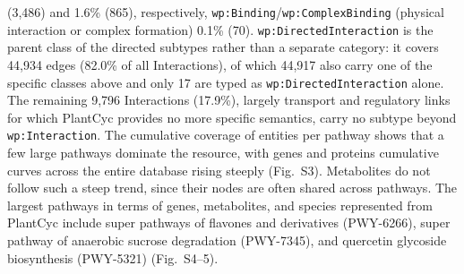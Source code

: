 \documentclass[11pt,a4paper]{article}
\begin{document}
(3,486) and 1.6\% (865), respectively, \texttt{wp:Binding}/\texttt{wp:ComplexBinding} (physical
interaction or complex formation) 0.1\% (70). \texttt{wp:DirectedInteraction} is the parent class
of the directed subtypes rather than a separate category: it covers 44,934 edges (82.0\% of all
Interactions), of which 44,917 also carry one of the specific classes above and only 17 are typed as
\texttt{wp:DirectedInteraction} alone. The remaining 9,796 Interactions (17.9\%), largely transport
and regulatory links for which PlantCyc provides no more specific semantics, carry no subtype beyond
\texttt{wp:Interaction}. The cumulative coverage of entities
per pathway shows that a few large pathways dominate the resource, with genes and proteins cumulative
curves across the entire database rising steeply (Fig.~S3). Metabolites do not follow such a steep
trend, since their nodes are often shared across pathways. The largest pathways in terms of genes,
metabolites, and species represented from PlantCyc include super pathways of flavones and derivatives
(PWY-6266), super pathway of anaerobic sucrose degradation (PWY-7345), and quercetin glycoside
biosynthesis (PWY-5321) (Fig.~S4--5).
\end{document}
